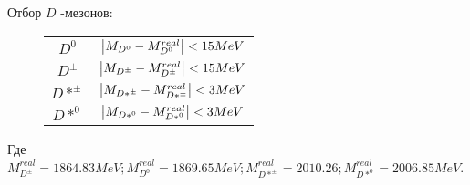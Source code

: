 \newdot Отбор $D$ -мезонов:

\begin{figure}[h]
    \centering
    \begin{tabular}{c|c}
        $D^0$ & $\abs{M_{D^0} - M^{real}_{D^0}} < 15 MeV$ \\
        $D^\pm$ & $\abs{M_{D^\pm} - M^{real}_{D^\pm}} < 15 MeV$ \\
        $D*^{\pm}$ & $\abs{M_{D*^\pm} - M^{real}_{D*^\pm}} < 3 MeV$ \\
        $D*^0$ & $\abs{M_{D*^0} - M^{real}_{D*^0}} < 3 MeV$ \\
    \end{tabular}
\end{figure}

Где $M^{real}_{D^\pm} = 1864.83 MeV; M^{real}_{D^0} = 1869.65 MeV; 
M^{real}_{D*^\pm} = 2010.26;  M^{real}_{D*^0} = 2006.85 MeV$. 




